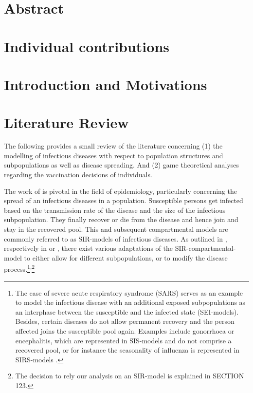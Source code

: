 \documentclass[11pt]{article}
\begin{document}

\tableofcontents

\newpage

\section*{Abstract}

\section{Individual contributions}

\section{Introduction and Motivations}

\clearpage
\section{Literature Review}
The following provides a small review of the literature concerning (1) the modelling of infectious diseases with respect to population structures and subpopulations as well as disease spreading. And (2) game theoretical analyses regarding the vaccination decisions of individuals. 

The work of \cite{kermack1927} is pivotal in the field of epidemiology, particularly concerning the spread of an infectious diseases in a population. Susceptible persons get infected based on the transmission rate of the disease and the size of the infectious subpopulation. They finally recover or die from the disease and hence join and stay in the recovered pool. This and subsequent compartmental models are commonly referred to as SIR-models of infectious diseases. 
As outlined in \cite{earn2008}, respectively in \cite{dadlani2013} or \cite{sun2016}, there exist various adaptations of the SIR-compartmental-model to either allow for different subpopulations, or to modify the disease process.\footnote{The case of severe acute respiratory syndrome (SARS) serves as an example to model the infectious disease with an additional exposed subpopulations as an interphase between the susceptible and the infected state (SEI-models). Besides, certain diseases do not allow permanent recovery and the person affected joins the susceptible pool again. Examples include gonorrhoea or encephalitis, which are represented in SIS-models and do not comprise a recovered pool, or for instance the seasonality of influenza is represented in SIRS-models \citep{dadlani2013}.}\textsuperscript{,}\footnote{The decision to rely our analysis on an SIR-model is explained in SECTION 123.} 
\end{document}
